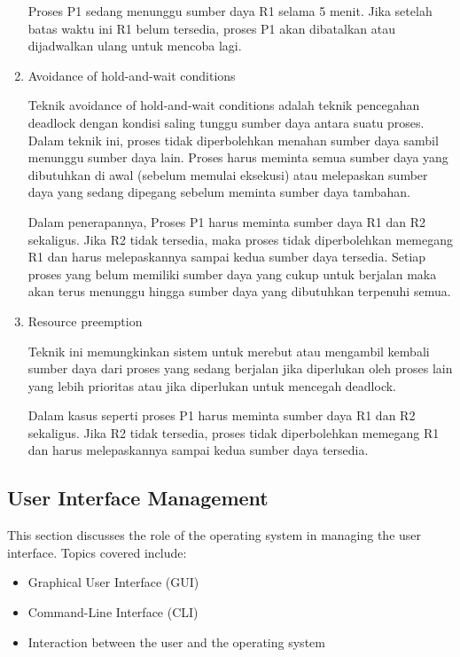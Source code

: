 \documentclass[12pt]{article}
\begin{document}
\begin{enumerate}
          \hspace{1cm}Proses P1 sedang menunggu sumber daya R1 selama 5 menit. Jika setelah batas waktu ini R1 belum tersedia, proses P1 akan dibatalkan atau dijadwalkan ulang untuk mencoba lagi.

    \item Avoidance of hold-and-wait conditions

          \hspace{1cm}Teknik avoidance of hold-and-wait
          conditions adalah teknik pencegahan deadlock dengan kondisi saling tunggu sumber daya antara suatu proses.
          Dalam teknik ini, proses tidak
          diperbolehkan menahan sumber daya sambil menunggu sumber daya lain. Proses
          harus meminta semua sumber daya yang dibutuhkan di awal (sebelum memulai
          eksekusi) atau melepaskan sumber daya yang sedang dipegang sebelum meminta
          sumber daya tambahan.

          \hspace{1cm}Dalam penerapannya, Proses P1 harus meminta sumber daya
          R1 dan R2 sekaligus. Jika R2 tidak tersedia, maka proses tidak diperbolehkan
          memegang R1 dan harus melepaskannya sampai kedua sumber daya tersedia.
          Setiap proses yang belum memiliki sumber daya yang cukup untuk berjalan maka
          akan terus menunggu hingga sumber daya yang dibutuhkan terpenuhi semua.

    \item Resource preemption

          \hspace{1cm}Teknik ini memungkinkan sistem untuk merebut atau
          mengambil kembali sumber daya dari proses yang sedang berjalan jika diperlukan
          oleh proses lain yang lebih prioritas atau jika diperlukan untuk mencegah
          deadlock.

          \hspace{1cm}Dalam kasus seperti proses P1 harus meminta sumber daya
          R1 dan R2 sekaligus. Jika R2 tidak tersedia, proses tidak diperbolehkan
          memegang R1 dan harus melepaskannya sampai kedua sumber daya tersedia.
\end{enumerate}

\subsection{User Interface Management}
This section discusses the role of the operating system in managing the user
interface. Topics covered include:
\begin{itemize}
    \item Graphical User Interface (GUI)
    \item Command-Line Interface (CLI)
    \item Interaction between the user and the operating system
\end{itemize}
\end{document}
